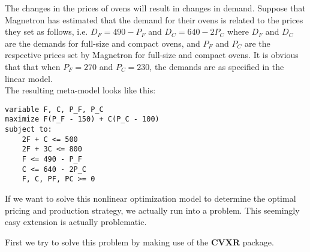\documentclass[a4paper]{article}\usepackage[]{graphicx}\usepackage[]{color}
\newcommand{\pkg}[1]{\textbf{#1}}
\begin{document}
The changes in the prices of ovens will result in changes in demand. 
Suppose that Magnetron has estimated that the demand for their ovens is 
related to the prices they set as follows, i.e. $D_F = 490 - P_F$ and 
$D_C = 640 - 2P_C$ where $D_F$ and $D_C$ are the demands for full-size and 
compact ovens, and $P_F$ and $P_C$ are the respective prices set by Magnetron
for full-size and compact ovens. It is obvious that that when $P_F = 270$ and 
$P_C = 230$, the demands are as specified in the linear model. \\
 
The resulting meta-model looks like this:
 
\begin{verbatim}
variable F, C, P_F, P_C
maximize F(P_F - 150) + C(P_C - 100)
subject to:
    2F + C <= 500  
    2F + 3C <= 800 
    F <= 490 - P_F  
    C <= 640 - 2P_C 
    F, C, PF, PC >= 0
\end{verbatim}
 
If we want to solve this nonlinear optimization model to determine the optimal 
pricing and production strategy, we actually run into a problem. 
This seemingly easy extension is actually problematic. 

First we try to solve this problem by making use of the \pkg{CVXR} package.
\end{document}
